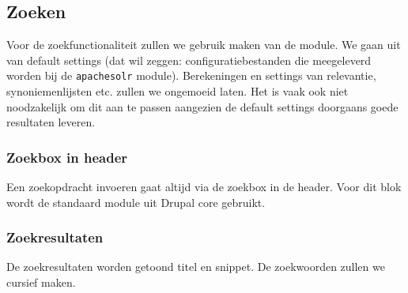 \subsection{Zoeken}\label{zoeken}
Voor de zoekfunctionaliteit zullen we gebruik maken van de  module. We gaan uit van default settings (dat wil zeggen: configuratiebestanden die meegeleverd worden bij de \texttt{apachesolr} module). Berekeningen en settings van relevantie, synoniemenlijsten etc. zullen we ongemoeid laten. Het is vaak ook niet noodzakelijk om dit aan te passen aangezien de default settings doorgaans goede resultaten leveren.

\subsubsection{Zoekbox in header}
Een zoekopdracht invoeren gaat altijd via de zoekbox in de header. Voor dit blok wordt de standaard  module uit Drupal core gebruikt.

\subsubsection{Zoekresultaten}
De zoekresultaten worden getoond titel en snippet. De zoekwoorden zullen we cursief maken.

